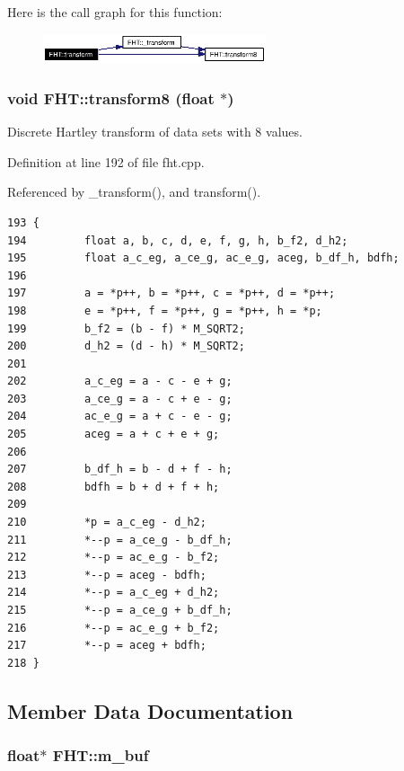 Here is the call graph for this function:\begin{figure}[H]
\begin{center}
\leavevmode
\includegraphics[width=186pt]{classFHT_FHTa15_cgraph}
\end{center}
\end{figure}
\subsubsection{\setlength{\rightskip}{0pt plus 5cm}void FHT::transform8 (float $\ast$)}\label{classFHT_FHTa14}


Discrete Hartley transform of data sets with 8 values.

Definition at line 192 of file fht.cpp.

Referenced by \_\-transform(), and transform().



\footnotesize\begin{verbatim}193 {
194         float a, b, c, d, e, f, g, h, b_f2, d_h2;
195         float a_c_eg, a_ce_g, ac_e_g, aceg, b_df_h, bdfh;
196 
197         a = *p++, b = *p++, c = *p++, d = *p++;
198         e = *p++, f = *p++, g = *p++, h = *p;
199         b_f2 = (b - f) * M_SQRT2;
200         d_h2 = (d - h) * M_SQRT2;
201 
202         a_c_eg = a - c - e + g;
203         a_ce_g = a - c + e - g;
204         ac_e_g = a + c - e - g;
205         aceg = a + c + e + g;
206 
207         b_df_h = b - d + f - h;
208         bdfh = b + d + f + h;
209 
210         *p = a_c_eg - d_h2;
211         *--p = a_ce_g - b_df_h;
212         *--p = ac_e_g - b_f2;
213         *--p = aceg - bdfh;
214         *--p = a_c_eg + d_h2;
215         *--p = a_ce_g + b_df_h;
216         *--p = ac_e_g + b_f2;
217         *--p = aceg + bdfh;
218 }
\end{verbatim}\normalsize 


\subsection{Member Data Documentation}
\subsubsection{\setlength{\rightskip}{0pt plus 5cm}float$\ast$ {\bf FHT::m\_\-buf}\hspace{0.3cm}{\tt  [private]}}\label{classFHT_FHTr2}




